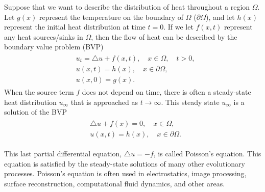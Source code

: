 \label{lab:finitedifference2}

Suppose that we want to describe the distribution of heat throughout a region $\Omega$.
Let $g(x)$ represent the temperature on the boundary of $\Omega$ ($\partial \Omega$), and let $h(x)$ represent the initial heat distribution at time $t = 0$.
If we let $f(x,t)$ represent any heat sources/sinks in $\Omega$, then the flow of heat can be described by the boundary value problem (BVP)
\begin{align}
	\begin{split}
		& { } u_t = \triangle u + f(x,t), \quad x \in \Omega, \quad t >0,\\
		& { }u(x,t) = h(x), \quad x \in \partial \Omega, \\
		& { }u(x,0) = g(x).
	\end{split}
\end{align}
When the source term $f$ does not depend on time, there is often a steady-state heat distribution $u_{\infty}$ that is approached as $t \to \infty$.
This steady state $u_{\infty}$ is a solution of the BVP
\begin{align}
	\begin{split}
		& { }  \triangle u + f(x) = 0, \quad x \in \Omega,\\
		& { }u(x,t) = h(x), \quad x \in \partial \Omega.
	\end{split}
\end{align}

This last partial differential equation, $\triangle u = -f$, is called Poisson's equation.
This equation is satisfied by the steady-state solutions of many other evolutionary processes.
Poisson's equation is often used in electrostatics, image processing, surface reconstruction, computational fluid dynamics, and other areas. 

